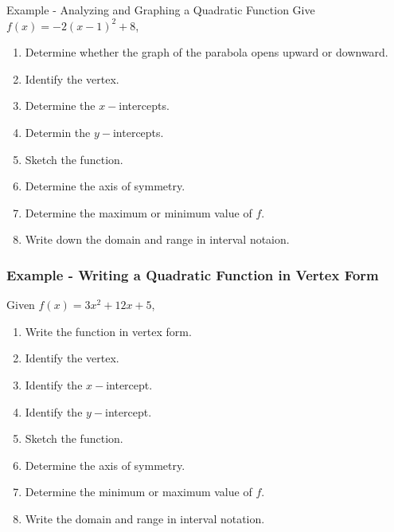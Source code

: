 \documentclass{beamer}
\begin{document}
\begin{frame}{Example - Analyzing and Graphing a Quadratic Function}
Give \(f(x)=-2(x-1)^2+8\),
\begin{enumerate}
    \item Determine whether the graph of the parabola opens upward or downward. \pause
    \item Identify the vertex. \pause 
    \item Determine the \(x-\)intercepts. \pause 
    \item Determin the \(y-\)intercepts. \pause
    \item Sketch the function. \pause
    \item Determine the axis of symmetry. \pause  
    \item Determine the maximum or minimum value of \(f\).\pause
    \item Write down the domain and range in interval notaion. 
\end{enumerate} 

    
\end{frame}

\begin{frame}
    \frametitle{Example - Writing a Quadratic Function in Vertex Form}

    Given \(f(x)=3x^2 +12x+5\),

    \begin{enumerate}
        \item Write the function in vertex form. \pause
        \item Identify the vertex. \pause
        \item Identify the \(x-\)intercept.\pause
        \item Identify the \(y-\)intercept. \pause
        \item Sketch the function.\pause
        \item Determine the axis of symmetry. \pause
        \item Determine the minimum or maximum value of \(f\). \pause
        \item Write the domain and range in interval notation. 
    \end{enumerate}

\end{frame}
\end{document}
